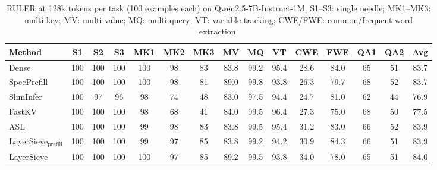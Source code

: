 \documentclass[10pt,conference]{IEEEtran}
\begin{document}
\begin{table}[h]
\centering
\caption{RULER at 128k tokens per task (100 examples each) on Qwen2.5-7B-Instruct-1M. S1--S3: single needle; MK1--MK3: multi-key; MV: multi-value; MQ: multi-query; VT: variable tracking; CWE/FWE: common/frequent word extraction.}
\label{tab:ruler128}
\setlength{\tabcolsep}{4pt}
\small
\begin{tabular}{lcccccccccccccc}
\toprule
Method & S1 & S2 & S3 & MK1 & MK2 & MK3 & MV & MQ & VT & CWE & FWE & QA1 & QA2 & Avg \\
\midrule
Dense & 100 & 100 & 100 & 100 & 98 & 83 & 83.8 & 99.2 & 95.4 & 28.6 & 84.0 & 65 & 51 & 83.7 \\
SpecPrefill & 100 & 100 & 100 & 100 & 98 & 81 & 89.0 & 99.8 & 93.8 & 26.3 & 79.7 & 68 & 52 & 83.7 \\
SlimInfer & 100 & 97 & 96 & 98 & 74 & 48 & 83.0 & 97.5 & 94.4 & 24.7 & 81.0 & 62 & 44 & 76.9 \\
FastKV & 100 & 100 & 100 & 98 & 68 & 41 & 84.0 & 99.5 & 96.4 & 27.3 & 75.0 & 68 & 50 & 77.5 \\
ASL & 100 & 100 & 100 & 99 & 98 & 83 & 83.8 & 99.5 & 95.4 & 31.2 & 83.0 & 66 & 52 & 83.9 \\
LayerSieve$_{\text{prefill}}$ & 100 & 100 & 100 & 99 & 97 & 85 & 83.8 & 99.2 & 94.2 & 30.9 & 84.3 & 66 & 51 & 83.9 \\
LayerSieve & 100 & 100 & 100 & 100 & 97 & 85 & 89.2 & 99.5 & 93.8 & 34.0 & 78.0 & 65 & 51 & 84.0 \\
\bottomrule
\end{tabular}
\end{table}
\end{document}
